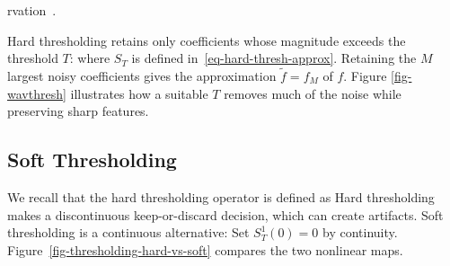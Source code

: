 rvation~\cite{donoho-shrinkage}.


Hard thresholding retains only coefficients whose magnitude exceeds the threshold $T$:
where $S_T$ is defined in~\eqref{eq-hard-thresh-approx}. Retaining the $M$ largest noisy coefficients gives the approximation $\tilde f = f_M$ of $f$. Figure \ref{fig-wavthresh} illustrates how a suitable $T$ removes much of the noise while preserving sharp features.

                                                                                                             

                                      
                                                                                                                                                                              

                                                     
\subsection{Soft Thresholding}

We recall that the hard thresholding operator is defined as
Hard thresholding makes a discontinuous keep-or-discard decision, which can create artifacts. Soft thresholding is a continuous alternative:
Set $S_T^1(0)=0$ by continuity. Figure~\ref{fig-thresholding-hard-vs-soft} compares the two nonlinear maps.


